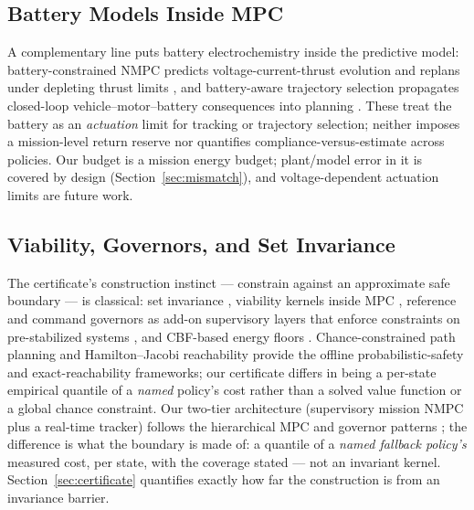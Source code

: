\documentclass[preprint,12pt]{elsarticle}
\begin{document}
\subsection{Battery Models Inside MPC}
A complementary line puts battery electrochemistry inside the
predictive model: battery-constrained NMPC predicts
voltage-current-thrust evolution and replans under depleting thrust
limits \cite{gupta2026bcnmpc}, and battery-aware trajectory selection
propagates closed-loop vehicle--motor--battery consequences into
planning \cite{kidambi2026battery}. These treat the battery as an
\emph{actuation} limit for tracking or trajectory selection; neither
imposes a mission-level return reserve nor quantifies
compliance-versus-estimate across policies. Our budget is a mission
energy budget; plant/model error in it is covered by design
(Section~\ref{sec:mismatch}), and voltage-dependent actuation limits
are future work.

\subsection{Viability, Governors, and Set Invariance}
The certificate's construction instinct --- constrain against an
approximate safe boundary --- is classical: set invariance
\cite{blanchini1999set}, viability kernels inside MPC
\cite{bertoni2026viability}, reference and command governors as
add-on supervisory layers that enforce constraints on pre-stabilized
systems \cite{garone2017reference}, and CBF-based energy floors
\cite{notomista2021persistification, ames2019control}. Chance-constrained path planning \cite{blackmore2011chance} and
Hamilton--Jacobi reachability \cite{bansal2017hamilton} provide
the offline probabilistic-safety and exact-reachability
frameworks; our certificate differs in being a per-state
empirical quantile of a \emph{named} policy's cost rather than
a solved value function or a global chance constraint. Our
two-tier architecture (supervisory mission NMPC plus a
real-time tracker) follows the hierarchical MPC and governor
patterns \cite{scattolini2009architectures, garone2017reference};
the difference is what
the boundary is made of: a quantile of a \emph{named fallback policy's}
measured cost, per state, with the coverage stated --- not an
invariant kernel. Section~\ref{sec:certificate} quantifies exactly how
far the construction is from an invariance barrier.
\end{document}

